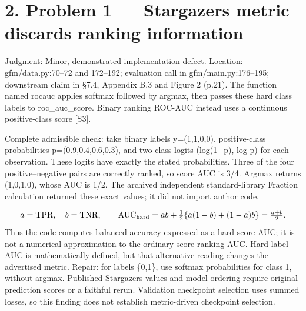 \documentclass[10pt]{article}
\begin{document}
\section*{2. Problem 1 — Stargazers metric discards ranking information}
Judgment: Minor, demonstrated implementation defect. Location: gfm/data.py:70–72 and 172–192; evaluation call in gfm/main.py:176–195; downstream claim in §7.4, Appendix B.3 and Figure 2 (p.21). The function named rocauc applies softmax followed by argmax, then passes these hard class labels to roc\_auc\_score. Binary ranking ROC-AUC instead uses a continuous positive-class score [S3].\par
Complete admissible check: take binary labels y=(1,1,0,0), positive-class probabilities p=(0.9,0.4,0.6,0.3), and two-class logits (log(1\(-\)p), log p) for each observation. These logits have exactly the stated probabilities. Three of the four positive–negative pairs are correctly ranked, so score AUC is 3/4. Argmax returns (1,0,1,0), whose AUC is 1/2. The archived independent standard-library Fraction calculation returned these exact values; it did not import author code.\par
\[a=\mathrm{TPR},\quad b=\mathrm{TNR},\qquad \mathrm{AUC}_{\rm hard}=ab+\tfrac12\{a(1-b)+(1-a)b\}=\tfrac{a+b}{2}.\] Thus the code computes balanced accuracy expressed as a hard-score AUC; it is not a numerical approximation to the ordinary score-ranking AUC. Hard-label AUC is mathematically defined, but that alternative reading changes the advertised metric. Repair: for labels \{0,1\}, use softmax probabilities for class 1, without argmax. Published Stargazers values and model ordering require original prediction scores or a faithful rerun. Validation checkpoint selection uses summed losses, so this finding does not establish metric-driven checkpoint selection.\par
\end{document}
